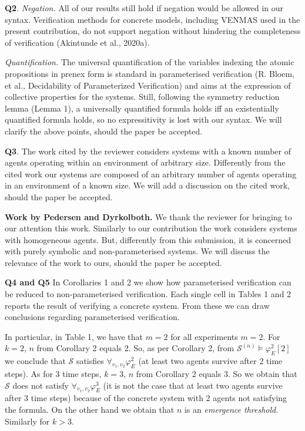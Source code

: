 \documentclass{article}
\begin{document}
\noindent
\textbf{Q2}. {\em Negation.} All of our results still hold if
negation would be allowed in our syntax. Verification methods for
concrete models, including VENMAS used in the present contribution, do not
support negation without hindering the completeness of verification (Akintunde
et al., 2020a). 

{\em Quantification.} The universal quantification of the variables indexing
the atomic propositions in prenex form is standard in parameterised
verification (R. Bloem, et al., Decidability of Parameterized Verification)
and aims at the expression of collective properties for the systems. Still,
following the symmetry reduction lemma (Lemma 1), a universally quantified
formula holds iff  an existentially quantified formula holds, so no
expressitivity is lost with our syntax. We will clarify the above points,
should the paper be accepted.

\noindent
\textbf{Q3}. The  work cited by the reviewer considers systems with a known
number of agents operating within an environment of arbitrary size. Differently
from the cited work our systems are composed of an arbitrary number of agents
operating in an environment of a known size. We will add a discussion on the cited
work,  should the paper be accepted.


\noindent
\textbf{Work by Pedersen and Dyrkolboth.} We thank the reviewer for bringing to
our attention this work. Similarly to our contribution the work considers
systems with homogeneous agents. But, differently from this submission, it is
concerned with purely symbolic and non-parameterised systems. We will discuss
the relevance of the work to ours, should the paper be accepted.


\noindent
\textbf{Q4 and Q5}
In Corollaries 1 and 2 we show how parameterised
verification can be reduced to non-parameterised verification. Each
single cell in Tables 1 and 2 reports the result of verifying a
concrete system. From these we can draw conclusions regarding
parameterised verification.

In particular, in Table 1, we have that $m=2$ for all experiments $m=2$. For
$k=2$, $n$ from Corollary 2 equals 2. So, as per Corollary 2, from
$\mathcal{S}^{(n)} \models \varphi^2_E[2]$ we conclude that $\mathcal{S}$
satisfies $\forall_{v_1,v_2} \varphi^2_E$ (at least two agents survive after 2
time steps). As for 3 time steps, $k=3$, $n$ from Corollary 2 equals 3. So we
obtain that $\mathcal{S}$ does not satisfy $\forall_{v_1,v_2} \varphi^3_E$ (it
is not the case that at least two agents survive after 3 time steps) because of
the concrete system with 2 agents not satisfying the formula. On the other hand
we obtain that $n$ is an \emph{emergence threshold}. Similarly for $k>3$.
\end{document}
